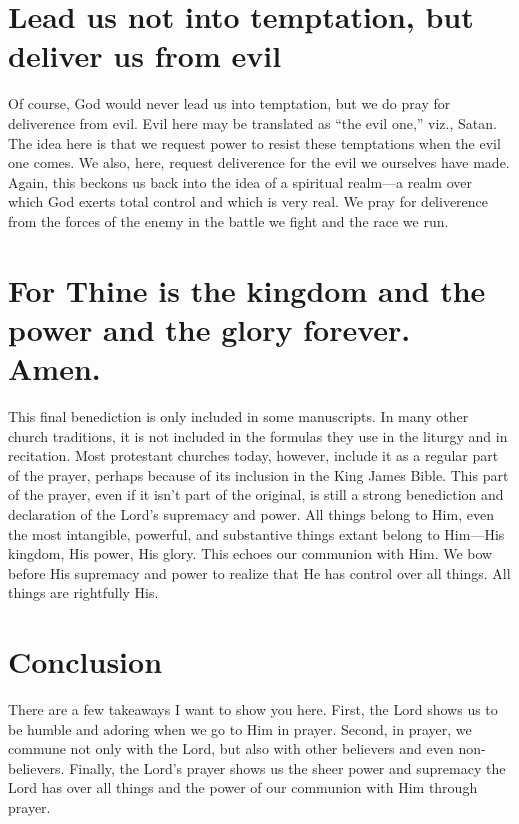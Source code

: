 \documentclass[12pt]{article}
\begin{document}
\section{Lead us not into temptation, but deliver us from evil}

Of course, God would never lead us into temptation, but we do pray for deliverence from evil.  Evil here may be translated as ``the evil one,'' viz., Satan.  The idea here is that we request power to resist these temptations when the evil one comes.  We also, here, request deliverence for the evil we ourselves have made.  Again, this beckons us back into the idea of a spiritual realm---a realm over which God exerts total control and which is very real.  We pray for deliverence from the forces of the enemy in the battle we fight and the race we run.

\section{For Thine is the kingdom and the power and the glory forever.  Amen.}

This final benediction is only included in some manuscripts.  In many other church traditions, it is not included in the formulas they use in the liturgy and in recitation.  Most protestant churches today, however, include it as a regular part of the prayer, perhaps because of its inclusion in the King James Bible.  This part of the prayer, even if it isn't part of the original, is still a strong benediction and declaration of the Lord's supremacy and power.  All things belong to Him, even the most intangible, powerful, and substantive things extant belong to Him---His kingdom, His power, His glory.  This echoes our communion with Him.  We bow before His supremacy and power to realize that He has control over all things.  All things are rightfully His.

\section{Conclusion}

There are a few takeaways I want to show you here.  First, the Lord shows us to be humble and adoring when we go to Him in prayer.  Second, in prayer, we commune not only with the Lord, but also with other believers and even non-believers.  Finally, the Lord's prayer shows us the sheer power and supremacy the Lord has over all things and the power of our communion with Him through prayer.
\end{document}
